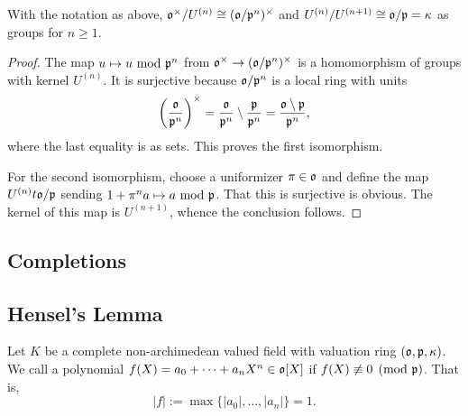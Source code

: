 \begin{proposition}
    With the notation as above, $\mathfrak{o}^\times/U^{(n)}\cong(\mathfrak{o}/\mathfrak{p}^n)^\times$ and $U^{(n)}/U^{(n + 1)}\cong\mathfrak{o}/\mathfrak{p} = \kappa$ as groups for $n\ge 1$.
\end{proposition}
\begin{proof}
    The map $u\mapsto u~\mathrm{mod}~\mathfrak{p}^n$ from $\mathfrak{o}^\times\to(\mathfrak{o}/\mathfrak{p}^n)^\times$ is a homomorphism of groups with kernel $U^{(n)}$. It is surjective because $\mathfrak{o}/\mathfrak{p}^n$ is a local ring with units 
    \begin{equation*}
        \left(\frac{\mathfrak{o}}{\mathfrak{p}^n}\right)^\times = \frac{\mathfrak{o}}{\mathfrak{p}^n}\setminus\frac{\mathfrak{p}}{\mathfrak{p}^n} = \frac{\mathfrak{o}\setminus\mathfrak{p}}{\mathfrak{p}^n},
    \end{equation*}
    where the last equality is as sets. This proves the first isomorphism.

    For the second isomorphism, choose a uniformizer $\pi\in\mathfrak{o}$ and define the map $U^{(n)}t\mathfrak{o}/\mathfrak{p}$ sending $1 + \pi^n a\mapsto a~\mathrm{mod}~\mathfrak{p}$. That this is surjective is obvious. The kernel of this map is $U^{(n + 1)}$, whence the conclusion follows.
\end{proof}

\subsection{Completions}



\subsection{Hensel's Lemma}

\begin{definition}
    Let $K$ be a complete non-archimedean valued field with valuation ring $(\mathfrak{o},\mathfrak{p},\kappa)$. We call a polynomial $f(X) = a_0 + \cdots + a_nX^n\in\mathfrak{o}[X]$  if $f(X)\not\equiv0\pmod{\mathfrak{p}}$. That is, 
    \begin{equation*}
        |f| := \max\{|a_0|,\dots,|a_n|\} = 1.
    \end{equation*}
\end{definition}

